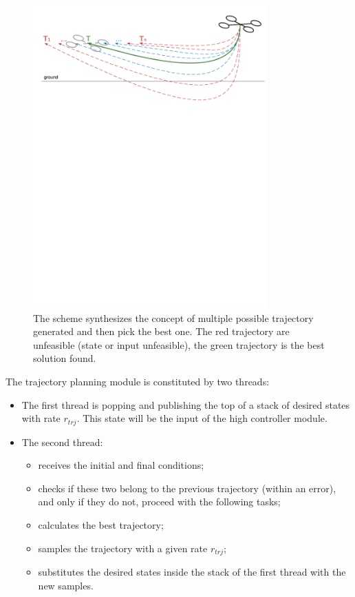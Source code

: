 \begin{figure}[!htbp]
    \centering
    \includegraphics[width=0.8\textwidth]{img/trajectory_generation.pdf}
    \caption{The scheme synthesizes the concept of multiple possible trajectory generated and then pick the best one. The red trajectory are unfeasible (state or input unfeasible), the green trajectory is the best solution found.}
    \label{fig:traject_gen}
\end{figure}

The trajectory planning module is constituted by two threads:
\begin{itemize}
\item The first thread is popping and publishing the top of a stack of desired states with rate $r_{trj}$. This state will be the input of the high controller module.
\item The second thread:
\begin{itemize}
\item receives the initial and final conditions;
\item checks if these two belong to the previous trajectory (within an error), and only if they do not, proceed with the following tasks;
\item calculates the best trajectory;
\item samples the trajectory with a given rate $r_{trj}$;
\item substitutes the desired states inside the stack of the first thread with the new samples.
\end{itemize}
\end{itemize}

